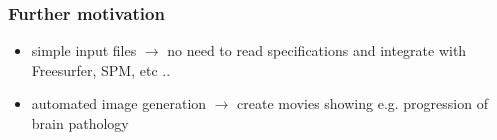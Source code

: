 \documentclass[10pt,xcolor=table,aspectratio=169]{beamer}
\begin{document}
\begin{frame}
 \frametitle{Further motivation}

 
\newcommand{\speed}{2} 
\newcommand{\animOne}{
\begin{animateinline}[autoplay,loop]{\speed}  
  \multiframe{1}{i=1+1}{%
  \centering
   \texttt{[image: images/sara\_video/outer-\\i.png]}
  }
\end{animateinline}
}
 
\begin{itemize}
 \item simple input files $\rightarrow$ no need to read specifications and integrate with Freesurfer, SPM, etc ..
 \item automated image generation $\rightarrow$ create movies showing e.g. progression of brain pathology

 
\begin{figure}


\end{figure}
\end{itemize}
\end{frame}
\end{document}
